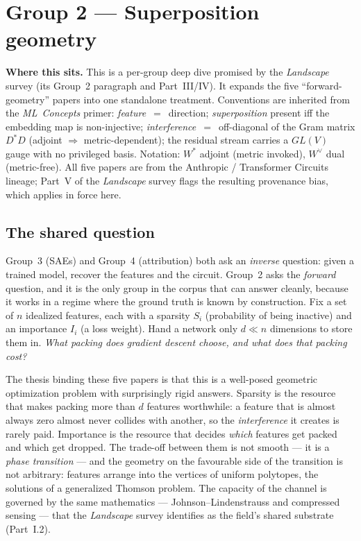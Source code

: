 


\section*{Group 2 --- Superposition geometry}

\begin{callout}
\textbf{Where this sits.} This is a per-group deep dive promised by the \emph{Landscape} survey (its Group~2 paragraph and Part~III/IV). It expands the five ``forward-geometry'' papers into one standalone treatment. Conventions are inherited from the \emph{ML~Concepts} primer: \emph{feature}~$=$~direction; \emph{superposition} present iff the embedding map is non-injective; \emph{interference}~$=$~off-diagonal of the Gram matrix $D^{*}D$ (adjoint $\Rightarrow$ metric-dependent); the residual stream carries a $GL(V)$ gauge with no privileged basis. Notation: $W^{*}$ adjoint (metric invoked), $W^{\vee}$ dual (metric-free). All five papers are from the Anthropic / Transformer Circuits lineage; Part~V of the \emph{Landscape} survey flags the resulting provenance bias, which applies in force here.
\end{callout}


\subsection*{The shared question}

Group~3 (SAEs) and Group~4 (attribution) both ask an \emph{inverse} question: given a trained model, recover the features and the circuit. Group~2 asks the \emph{forward} question, and it is the only group in the corpus that can answer cleanly, because it works in a regime where the ground truth is known by construction. Fix a set of $n$ idealized features, each with a sparsity $S_i$ (probability of being inactive) and an importance $I_i$ (a loss weight). Hand a network only $d \ll n$ dimensions to store them in. \emph{What packing does gradient descent choose, and what does that packing cost?}

The thesis binding these five papers is that this is a well-posed geometric optimization problem with surprisingly rigid answers. Sparsity is the resource that makes packing more than $d$ features worthwhile: a feature that is almost always zero almost never collides with another, so the \emph{interference} it creates is rarely paid. Importance is the resource that decides \emph{which} features get packed and which get dropped. The trade-off between them is not smooth --- it is a \emph{phase transition} --- and the geometry on the favourable side of the transition is not arbitrary: features arrange into the vertices of uniform polytopes, the solutions of a generalized Thomson problem. The capacity of the channel is governed by the same mathematics --- Johnson--Lindenstrauss and compressed sensing --- that the \emph{Landscape} survey identifies as the field's shared substrate (Part~I.2).

